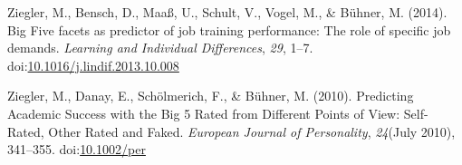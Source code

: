 \documentclass[man]{apa6}
\theoremstyle{definition}
\theoremstyle{definition}
\theoremstyle{definition}
\theoremstyle{remark}
\begin{document}
\leavevmode\hypertarget{ref-Ziegler2014}{}%
Ziegler, M., Bensch, D., Maaß, U., Schult, V., Vogel, M., \& Bühner, M.
(2014). Big Five facets as predictor of job training performance: The
role of specific job demands. \emph{Learning and Individual
Differences}, \emph{29}, 1--7.
doi:\href{https://doi.org/10.1016/j.lindif.2013.10.008}{10.1016/j.lindif.2013.10.008}

\leavevmode\hypertarget{ref-Ziegler2010}{}%
Ziegler, M., Danay, E., Schölmerich, F., \& Bühner, M. (2010).
Predicting Academic Success with the Big 5 Rated from Different Points
of View: Self-Rated, Other Rated and Faked. \emph{European Journal of
Personality}, \emph{24}(July 2010), 341--355.
doi:\href{https://doi.org/10.1002/per}{10.1002/per}

\endgroup
\end{document}
